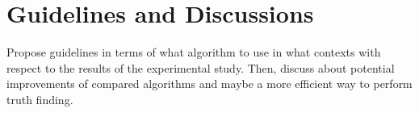 \section{Guidelines and Discussions}
Propose guidelines in terms of what algorithm to use in what contexts with respect to 
the results of the experimental study. Then, discuss about potential improvements of 
compared algorithms and maybe a more efficient way to perform truth finding.